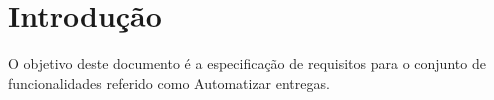 \documentclass[
	12pt,				%
	openright,			%
	twoside,			%
	a4paper,			%
	english,			%
	french,				%
	spanish,			%
	brazil,				%
	]{abntex2}
\begin{document}
 
\frenchspacing
 
 
\imprimircapa
 
\tableofcontents*
\cleardoublepage
  
 
\textual
 
\chapter*[Introdução]{Introdução}
 
O objetivo deste documento é a especificação de requisitos para o conjunto de funcionalidades referido como Automatizar entregas.
 











 
\postextual
 
 

 


\end{document}
